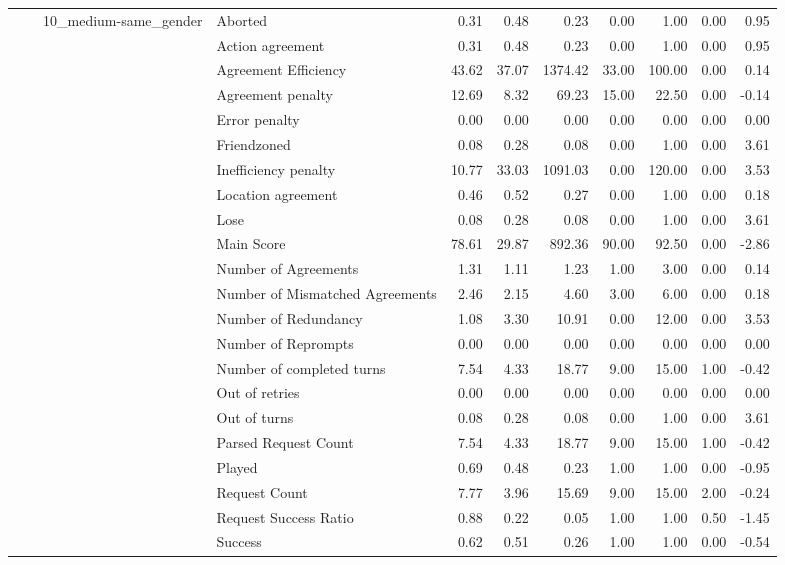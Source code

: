 \begin{tabular}{llllrrrrrrr}
\cline{3-11}
 &  & \multirow[t]{27}{*}{10_medium-same_gender} & Aborted & 0.31 & 0.48 & 0.23 & 0.00 & 1.00 & 0.00 & 0.95 \\
 &  &  & Action agreement & 0.31 & 0.48 & 0.23 & 0.00 & 1.00 & 0.00 & 0.95 \\
 &  &  & Agreement Efficiency & 43.62 & 37.07 & 1374.42 & 33.00 & 100.00 & 0.00 & 0.14 \\
 &  &  & Agreement penalty & 12.69 & 8.32 & 69.23 & 15.00 & 22.50 & 0.00 & -0.14 \\
 &  &  & Error penalty & 0.00 & 0.00 & 0.00 & 0.00 & 0.00 & 0.00 & 0.00 \\
 &  &  & Friendzoned & 0.08 & 0.28 & 0.08 & 0.00 & 1.00 & 0.00 & 3.61 \\
 &  &  & Inefficiency penalty & 10.77 & 33.03 & 1091.03 & 0.00 & 120.00 & 0.00 & 3.53 \\
 &  &  & Location agreement & 0.46 & 0.52 & 0.27 & 0.00 & 1.00 & 0.00 & 0.18 \\
 &  &  & Lose & 0.08 & 0.28 & 0.08 & 0.00 & 1.00 & 0.00 & 3.61 \\
 &  &  & Main Score & 78.61 & 29.87 & 892.36 & 90.00 & 92.50 & 0.00 & -2.86 \\
 &  &  & Number of Agreements & 1.31 & 1.11 & 1.23 & 1.00 & 3.00 & 0.00 & 0.14 \\
 &  &  & Number of Mismatched Agreements & 2.46 & 2.15 & 4.60 & 3.00 & 6.00 & 0.00 & 0.18 \\
 &  &  & Number of Redundancy & 1.08 & 3.30 & 10.91 & 0.00 & 12.00 & 0.00 & 3.53 \\
 &  &  & Number of Reprompts & 0.00 & 0.00 & 0.00 & 0.00 & 0.00 & 0.00 & 0.00 \\
 &  &  & Number of completed turns & 7.54 & 4.33 & 18.77 & 9.00 & 15.00 & 1.00 & -0.42 \\
 &  &  & Out of retries & 0.00 & 0.00 & 0.00 & 0.00 & 0.00 & 0.00 & 0.00 \\
 &  &  & Out of turns & 0.08 & 0.28 & 0.08 & 0.00 & 1.00 & 0.00 & 3.61 \\
 &  &  & Parsed Request Count & 7.54 & 4.33 & 18.77 & 9.00 & 15.00 & 1.00 & -0.42 \\
 &  &  & Played & 0.69 & 0.48 & 0.23 & 1.00 & 1.00 & 0.00 & -0.95 \\
 &  &  & Request Count & 7.77 & 3.96 & 15.69 & 9.00 & 15.00 & 2.00 & -0.24 \\
 &  &  & Request Success Ratio & 0.88 & 0.22 & 0.05 & 1.00 & 1.00 & 0.50 & -1.45 \\
 &  &  & Success & 0.62 & 0.51 & 0.26 & 1.00 & 1.00 & 0.00 & -0.54 \\

\end{tabular}
